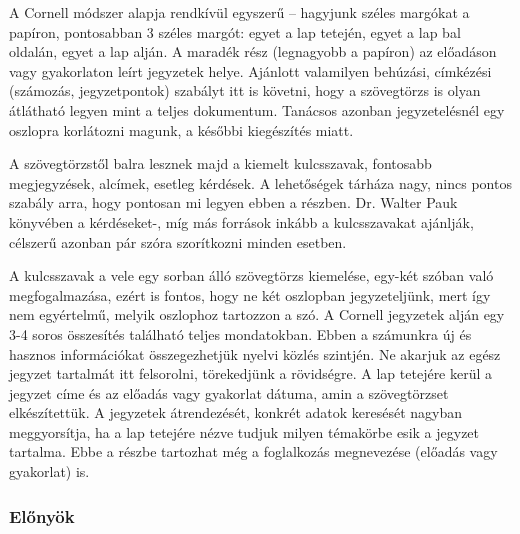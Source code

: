 \documentclass[../Main.tex]{subfiles}
\begin{document}
\begin{flushleft}
A Cornell módszer alapja rendkívül
egyszerű – hagyjunk széles margókat a
papíron, pontosabban 3 széles margót: egyet a
lap tetején, egyet a lap bal oldalán, egyet a lap
alján. A maradék rész (legnagyobb a papíron)
az előadáson vagy gyakorlaton leírt jegyzetek
helye. Ajánlott valamilyen behúzási,
címkézési (számozás, jegyzetpontok) szabályt
itt is követni, hogy a szövegtörzs is olyan
átlátható legyen mint a teljes dokumentum.
Tanácsos azonban jegyzetelésnél egy oszlopra
korlátozni magunk, a későbbi kiegészítés
miatt.

A szövegtörzstől balra lesznek majd a
kiemelt kulcsszavak, fontosabb megjegyzések,
alcímek, esetleg kérdések. A lehetőségek
tárháza nagy, nincs pontos szabály arra, hogy
pontosan mi legyen ebben a részben. Dr. Walter
Pauk könyvében a kérdéseket-, míg más források 
inkább a kulcsszavakat ajánlják, célszerű azonban
pár szóra szorítkozni minden esetben.
\end{flushleft}

\begin{flushleft}
A kulcsszavak a vele egy sorban álló szövegtörzs kiemelése, egy-két szóban való
megfogalmazása, ezért is fontos, hogy ne két oszlopban jegyzeteljünk, mert így nem
egyértelmű, melyik oszlophoz tartozzon a szó.
 A Cornell jegyzetek alján egy 3-4 soros összesítés található teljes mondatokban. Ebben
a számunkra új és hasznos információkat összegezhetjük nyelvi közlés szintjén. Ne
akarjuk az egész jegyzet tartalmát itt felsorolni, törekedjünk a rövidségre.
A lap tetejére kerül a jegyzet címe és az előadás vagy gyakorlat dátuma, amin a
szövegtörzset elkészítettük. A jegyzetek átrendezését, konkrét adatok keresését nagyban
meggyorsítja, ha a lap tetejére nézve tudjuk milyen témakörbe esik a jegyzet tartalma.
Ebbe a részbe tartozhat még a foglalkozás megnevezése (előadás vagy gyakorlat) is.
\end{flushleft}

\subsubsection{Előnyök}
\end{document}
